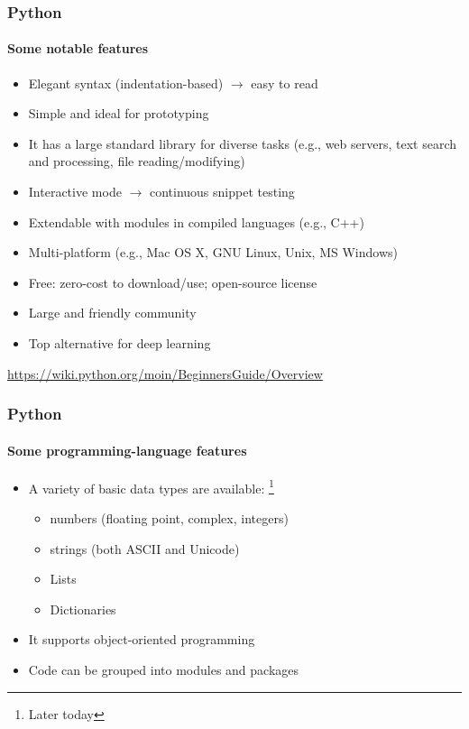 \documentclass[xcolor=x11names]{beamer}
\newcommand{\light}[1]{\textcolor{gray}{#1}}
\begin{document}
\begin{frame}
\frametitle{Python}
\framesubtitle{Some notable features}

\begin{itemize}
\item Elegant syntax (indentation-based) $\rightarrow$ easy to read	\pause 
\item Simple and ideal for prototyping	\pause 
\item It has a large standard library for diverse tasks (e.g., web servers, 
text search and processing, file reading/modifying)	\pause 
\item Interactive mode $\rightarrow$ continuous snippet testing	\pause 
\item Extendable with modules in compiled languages (e.g., C++)	\pause 
\item Multi-platform (e.g., Mac OS X, GNU Linux, Unix, MS Windows)	\pause 
\item Free: zero-cost to download/use; open-source license	\pause 
\item Large and friendly community		\pause 
\item Top alternative for deep learning
\end{itemize}
\bigskip 

\onslide 
\light{\url{https://wiki.python.org/moin/BeginnersGuide/Overview}}
\end{frame}

\begin{frame}
\frametitle{Python}
\framesubtitle{Some programming-language features}

\begin{itemize}
\item A variety of basic data types are available:%
\footnote{Later today}
\begin{itemize}
 \item numbers (floating point, complex, integers)
 \item strings (both ASCII and Unicode)
 \item Lists
 \item Dictionaries
\end{itemize}		\bigskip	\pause 
 
\item It supports object-oriented programming	\bigskip

\item Code can be grouped into modules and packages
\end{itemize}
\end{frame}
\end{document}
